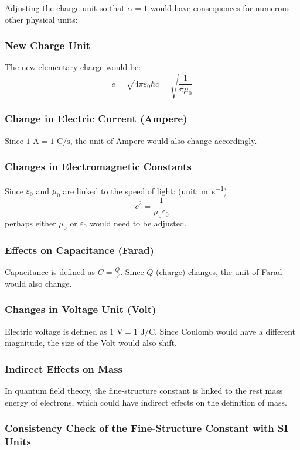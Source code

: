 \documentclass{article}
\begin{document}
	Adjusting the charge unit so that $\alpha = 1$ would have consequences for numerous other physical units:
	
	\subsubsection{New Charge Unit}
	The new elementary charge would be:
	$$e = \sqrt{4\pi\varepsilon_0\hbar c} = \sqrt{\frac{1}{\pi \mu_0}}$$
	
	\subsubsection{Change in Electric Current (Ampere)}
	Since $1 \text{ A} = 1 \text{ C}/\text{s}$, the unit of Ampere would also change accordingly.
	
	\subsubsection{Changes in Electromagnetic Constants}
	Since $\varepsilon_0$ and $\mu_0$ are linked to the speed of light:
	(unit: \si{\meter\per\second})
	$$c^2 = \frac{1}{\mu_0\varepsilon_0}$$
	perhaps either $\mu_0$ or $\varepsilon_0$ would need to be adjusted.
	
	\subsubsection{Effects on Capacitance (Farad)}
	Capacitance is defined as $C = \frac{Q}{V}$. Since $Q$ (charge) changes, the unit of Farad would also change.
	
	\subsubsection{Changes in Voltage Unit (Volt)}
	Electric voltage is defined as $1 \text{ V} = 1 \text{ J}/\text{C}$. Since Coulomb would have a different magnitude, the size of the Volt would also shift.
	
	\subsubsection{Indirect Effects on Mass}
	In quantum field theory, the fine-structure constant is linked to the rest mass energy of electrons, which could have indirect effects on the definition of mass.
	
	\subsubsection{Consistency Check of the Fine-Structure Constant with SI Units}
	
\end{document}

